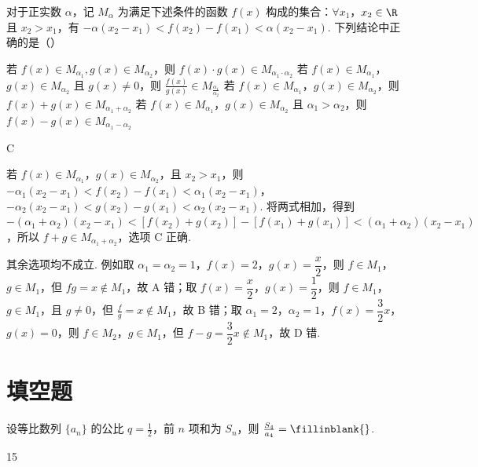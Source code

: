 \begin{problem}
对于正实数 \(\alpha\)，记 \(M_\alpha\) 为满足下述条件的函数 \(f(x)\) 构成的集合：\(\forall x_1\)，\(x_2\in\R\) 且 \(x_2>x_1\)，有 \(-\alpha(x_2-x_1)<f(x_2)-f(x_1)<\alpha(x_2-x_1)\). 下列结论中正确的是（\quad）

\choices
    {若 \(f(x)\in M_{\alpha_1}, g(x)\in M_{\alpha_2}\)，则 \(f(x)\cdot g(x)\in M_{\alpha_1\cdot\alpha_2}\)}
    {若 \(f(x)\in M_{\alpha_1}\)，\(g(x)\in M_{\alpha_2}\) 且 \(g(x)\neq 0\)，则 \(\frac{f(x)}{g(x)}\in M_{\frac{\alpha_1}{\alpha_2}}\)}
    {若 \(f(x)\in M_{\alpha_1}\)，\(g(x)\in M_{\alpha_2}\)，则 \(f(x)+g(x)\in M_{\alpha_1+\alpha_2}\)}
    {若 \(f(x)\in M_{\alpha_1}\)，\(g(x)\in M_{\alpha_2}\) 且 \(\alpha_1>\alpha_2\)，则 \(f(x)-g(x)\in M_{\alpha_1-\alpha_2}\)}
\end{problem}

\begin{answer}
C
\end{answer}

\begin{solution}
若 \(f(x)\in M_{\alpha_1}\)，\(g(x)\in M_{\alpha_2}\)，且 \(x_2>x_1\)，则
\( -\alpha_1(x_2-x_1)<f(x_2)-f(x_1)<\alpha_1(x_2-x_1)\)，
\( -\alpha_2(x_2-x_1)<g(x_2)-g(x_1)<\alpha_2(x_2-x_1)\).
将两式相加，得到
\( -(\alpha_1+\alpha_2)(x_2-x_1)<[f(x_2)+g(x_2)]-[f(x_1)+g(x_1)]<(\alpha_1+\alpha_2)(x_2-x_1)\)，所以 \(f+g\in M_{\alpha_1+\alpha_2}\)，选项 C 正确.

其余选项均不成立. 例如取 \(\alpha_1=\alpha_2=1\)，\(f(x)=2\)，\(g(x)=\dfrac{x}{2}\)，则 \(f\in M_1\)，\(g\in M_1\)，但 \(fg=x\notin M_1\)，故 A 错；取 \(f(x)=\dfrac{x}{2}\)，\(g(x)=\dfrac12\)，则 \(f\in M_1\)，\(g\in M_1\)，且 \(g\neq0\)，但 \(\frac{f}{g}=x\notin M_1\)，故 B 错；取 \(\alpha_1=2\)，\(\alpha_2=1\)，\(f(x)=\dfrac32x\)，\(g(x)=0\)，则 \(f\in M_2\)，\(g\in M_1\)，但 \(f-g=\dfrac32x\notin M_1\)，故 D 错.
\end{solution}

\section{填空题}

\begin{problem}
设等比数列 \(\{a_n\}\) 的公比 \(q=\frac{1}{2}\)，前 \(n\) 项和为 \(S_n\)，则 \(\frac{S_4}{a_4}=\fillinblank{}\).
\end{problem}

\begin{answer}
15
\end{answer}

